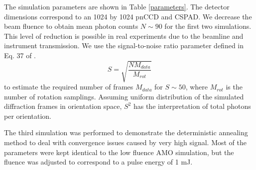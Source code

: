 \documentclass[]{iucr}              %
\begin{document}
The simulation parameters are shown in Table \ref{parameters}. The detector dimensions correspond to an 1024 by 1024 pnCCD and CSPAD. We decrease the beam fluence to obtain mean photon counts $N\sim 90$ for the first two simulations. This level of reduction is possible in real experiments due to the beamline and instrument transmission. We use the signal-to-noise ratio parameter defined in Eq. 37 of . 
\begin{equation}
S = \sqrt{\frac{N M_{data}}{M_{rot}}}
\end{equation}
to estimate the required number of frames $M_{data}$ for $S\sim50$, where $M_{rot}$ is the number of rotation samplings. Assuming uniform distribution of the simulated diffraction frames in orientation space, $S^2$ has the interpretation of total photons per orientation.

The third simulation was performed to demonstrate the deterministic annealing method to deal with convergence issues caused by very high signal. Most of the parameters were kept identical to the low fluence AMO simulation, but the fluence was adjusted to correspond to a pulse energy of 1 mJ.
\end{document}
